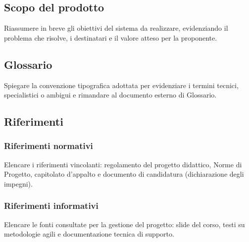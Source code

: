 \documentclass[11pt, a4paper]{article}
\begin{document}
	\subsection{Scopo del prodotto}
	Riassumere in breve gli obiettivi del sistema da realizzare, evidenziando il problema che risolve, i destinatari e il valore atteso per la proponente.
	
	\subsection{Glossario}
	Spiegare la convenzione tipografica adottata per evidenziare i termini tecnici, specialistici o ambigui e rimandare al documento esterno di Glossario.
	
	\subsection{Riferimenti}
	\subsubsection{Riferimenti normativi}
	Elencare i riferimenti vincolanti: regolamento del progetto didattico, Norme di Progetto, capitolato d'appalto e documento di candidatura (dichiarazione degli impegni).
	
	\subsubsection{Riferimenti informativi}
	Elencare le fonti consultate per la gestione del progetto: slide del corso, testi su metodologie agili e documentazione tecnica di supporto.
	
	\newpage
	
\end{document}

